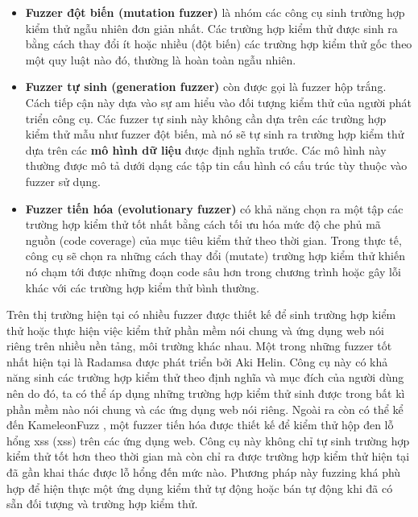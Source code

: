 \begin{itemize}
    \item \textbf{Fuzzer đột biến (mutation fuzzer)} là nhóm các công cụ sinh trường hợp kiểm thử ngẫu nhiên đơn giản nhất. Các trường hợp kiểm thử được sinh ra bằng cách thay đổi ít hoặc nhiều (đột biến) các trường hợp kiểm thử gốc theo một quy luật nào đó, thường là hoàn toàn ngẫu nhiên.
    \item \textbf{Fuzzer tự sinh (generation fuzzer)} còn được gọi là fuzzer hộp trắng. Cách tiếp cận này dựa vào sự am hiểu vào đối tượng kiểm thử của người phát triển công cụ. Các fuzzer tự sinh này không cần dựa trên các trường hợp kiểm thử mẫu như fuzzer đột biến, mà nó sẽ tự sinh ra trường hợp kiểm thử dựa trên các \textbf{mô hình dữ liệu} được định nghĩa trước. Các mô hình này thường được mô tả dưới dạng các tập tin cấu hình có cấu trúc tùy thuộc vào fuzzer sử dụng.
    \item \textbf{Fuzzer tiến hóa (evolutionary fuzzer)} có khả năng chọn ra một tập các trường hợp kiểm thử tốt nhất bằng cách tối ưu hóa mức độ che phủ mã nguồn (code coverage) của mục tiêu kiểm thử theo thời gian. Trong thực tế, công cụ sẽ chọn ra những cách thay đổi (mutate) trường hợp kiểm thử khiến nó chạm tới được những đoạn code sâu hơn trong chương trình hoặc gây lỗi khác với các trường hợp kiểm thử bình thường.
\end{itemize}
Trên thị trường hiện tại có nhiều fuzzer được thiết kế để sinh trường hợp kiểm thử hoặc thực hiện việc kiểm thử phần mềm nói chung và ứng dụng web nói riêng trên nhiều nền tảng, môi trường khác nhau. Một trong những fuzzer tốt nhất hiện tại là Radamsa được phát triển bởi Aki Helin. Công cụ này có khả năng sinh các trường hợp kiểm thử theo định nghĩa và mục đích của người dùng nên do đó, ta có thể áp dụng những trường hợp kiểm thử sinh được trong bất kì phần mềm nào nói chung và các ứng dụng web nói riêng. Ngoài ra còn có thể kể đến KameleonFuzz \parencite{KameleonFuzz}, một fuzzer tiến hóa được thiết kế để kiểm thử hộp đen lỗ hổng \acrshort{xss} (\acrlong{xss}) trên các ứng dụng web. Công cụ này không chỉ tự sinh trường hợp kiểm thử tốt hơn theo thời gian mà còn chỉ ra được trường hợp kiểm thử hiện tại đã gần khai thác được lỗ hổng đến mức nào. Phương pháp này fuzzing khá phù hợp để hiện thực một ứng dụng kiểm thử tự động hoặc bán tự động khi đã có sẵn đối tượng và trường hợp kiểm thử.